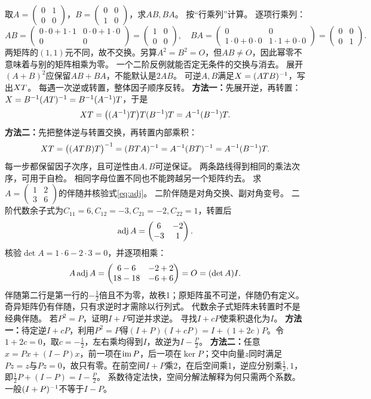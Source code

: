 {取$A=\begin{pmatrix}0&1\\0&0\end{pmatrix}$，$B=\begin{pmatrix}0&0\\1&0\end{pmatrix}$，求$AB,BA$。}
{按“行乘列”计算。}
{逐项行乘列：
\[AB=\begin{pmatrix}0\cdot0+1\cdot1&0\cdot0+1\cdot0\\0&0\end{pmatrix}=\begin{pmatrix}1&0\\0&0\end{pmatrix},\quad
BA=\begin{pmatrix}0&0\\1\cdot0+0\cdot0&1\cdot1+0\cdot0\end{pmatrix}=\begin{pmatrix}0&0\\0&1\end{pmatrix}.\]
两矩阵的$(1,1)$元不同，故不交换。另算$A^2=B^2=O$，但$AB\ne O$，因此幂零不意味着与别的矩阵相乘为零。}
{一个二阶反例就能否定无条件的交换与消去。}
{展开$(A+B)^2$应保留$AB+BA$，不能默认是$2AB$。}
{可逆$A,B$满足$X=(AT B)^{-1}$，写出$XT$。}
{每遇一次逆或转置，整体因子顺序反转。}
{\textbf{方法一：}先展开逆，再转置：$X=B^{-1}(AT)^{-1}=B^{-1}(A^{-1})T$，于是
\[XT=\bigl((A^{-1})T\bigr)T(B^{-1})T=A^{-1}(B^{-1})T.\]
\textbf{方法二：}先把整体逆与转置交换，再转置内部乘积：
\[XT=\bigl((AT B)T\bigr)^{-1}=(BT A)^{-1}=A^{-1}(BT)^{-1}=A^{-1}(B^{-1})T.\]
每一步都保留因子次序，且可逆性由$A,B$可逆保证。}
{两条路线得到相同的乘法次序，可用于自检。}
{相同字母位置不同也不能跨越另一个矩阵约去。}
{求$A=\begin{pmatrix}1&2\\3&6\end{pmatrix}$的伴随并核验式\eqref{eq:adj}。}
{二阶伴随是对角交换、副对角变号。}
{二阶代数余子式为$C_{11}=6,C_{12}=-3,C_{21}=-2,C_{22}=1$，转置后
\[\operatorname{adj} A=\begin{pmatrix}6&-2\\-3&1\end{pmatrix}.\]
核验$\det A=1\cdot6-2\cdot3=0$，并逐项相乘：
\[A\operatorname{adj} A=\begin{pmatrix}6-6&-2+2\\18-18&-6+6\end{pmatrix}=O=(\det A)I.\]
伴随第二行是第一行的$-\frac{1}{2}$倍且不为零，故秩1；原矩阵虽不可逆，伴随仍有定义。}
{奇异矩阵仍有伴随，只有求逆时才需除以行列式。}
{代数余子式矩阵未转置时不是经典伴随。}
{若$P^2=P$，证明$I+P$可逆并求逆。}
{寻找$I+cP$使乘积退化为$I$。}
{\textbf{方法一：}待定逆$I+cP$，利用$P^2=P$得$(I+P)(I+cP)=I+(1+2c)P$。令$1+2c=0$，取$c=-\frac{1}{2}$，左右乘均得到$I$，故逆为$I-\frac{P}{2}$。
\textbf{方法二：}任意$x=Px+(I-P)x$，前一项在$\operatorname{im} P$，后一项在$\ker P$；交中向量$z$同时满足$Pz=z$与$Pz=0$，故只有零。在前空间$I+P$乘2，在后空间乘1，逆应分别乘$\frac{1}{2},1$，即$\frac12P+(I-P)=I-\frac{P}{2}$。}
{系数待定法快，空间分解法解释为何只需两个系数。}
{一般$(I+P)^{-1}$不等于$I-P$。}


